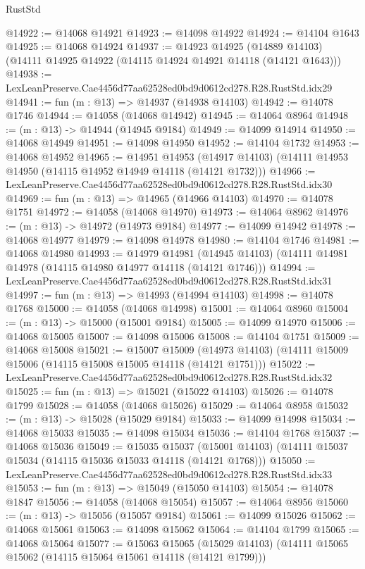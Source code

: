 \begin{lexlean}{RustStd}
\begin{coremodule}
@14922 := @14068 @14921
@14923 := @14098 @14922
@14924 := @14104 @1643
@14925 := @14068 @14924
@14937 := @14923
    @14925
    (@14889 @14103)
    (@14111 @14925 @14922 (@14115 @14924 @14921 @14118 (@14121 @1643)))
@14938 := LexLeanPreserve.Cae4456d77aa62528ed0bd9d0612cd278.R28.RustStd.idx29
@14941 := fun (m : @13) => @14937 (@14938 @14103)
@14942 := @14078 @1746
@14944 := @14058 (@14068 @14942)
@14945 := @14064 @8964
@14948 := (m : @13) -> @14944 (@14945 @9184)
@14949 := @14099 @14914
@14950 := @14068 @14949
@14951 := @14098 @14950
@14952 := @14104 @1732
@14953 := @14068 @14952
@14965 := @14951
    @14953
    (@14917 @14103)
    (@14111 @14953 @14950 (@14115 @14952 @14949 @14118 (@14121 @1732)))
@14966 := LexLeanPreserve.Cae4456d77aa62528ed0bd9d0612cd278.R28.RustStd.idx30
@14969 := fun (m : @13) => @14965 (@14966 @14103)
@14970 := @14078 @1751
@14972 := @14058 (@14068 @14970)
@14973 := @14064 @8962
@14976 := (m : @13) -> @14972 (@14973 @9184)
@14977 := @14099 @14942
@14978 := @14068 @14977
@14979 := @14098 @14978
@14980 := @14104 @1746
@14981 := @14068 @14980
@14993 := @14979
    @14981
    (@14945 @14103)
    (@14111 @14981 @14978 (@14115 @14980 @14977 @14118 (@14121 @1746)))
@14994 := LexLeanPreserve.Cae4456d77aa62528ed0bd9d0612cd278.R28.RustStd.idx31
@14997 := fun (m : @13) => @14993 (@14994 @14103)
@14998 := @14078 @1768
@15000 := @14058 (@14068 @14998)
@15001 := @14064 @8960
@15004 := (m : @13) -> @15000 (@15001 @9184)
@15005 := @14099 @14970
@15006 := @14068 @15005
@15007 := @14098 @15006
@15008 := @14104 @1751
@15009 := @14068 @15008
@15021 := @15007
    @15009
    (@14973 @14103)
    (@14111 @15009 @15006 (@14115 @15008 @15005 @14118 (@14121 @1751)))
@15022 := LexLeanPreserve.Cae4456d77aa62528ed0bd9d0612cd278.R28.RustStd.idx32
@15025 := fun (m : @13) => @15021 (@15022 @14103)
@15026 := @14078 @1799
@15028 := @14058 (@14068 @15026)
@15029 := @14064 @8958
@15032 := (m : @13) -> @15028 (@15029 @9184)
@15033 := @14099 @14998
@15034 := @14068 @15033
@15035 := @14098 @15034
@15036 := @14104 @1768
@15037 := @14068 @15036
@15049 := @15035
    @15037
    (@15001 @14103)
    (@14111 @15037 @15034 (@14115 @15036 @15033 @14118 (@14121 @1768)))
@15050 := LexLeanPreserve.Cae4456d77aa62528ed0bd9d0612cd278.R28.RustStd.idx33
@15053 := fun (m : @13) => @15049 (@15050 @14103)
@15054 := @14078 @1847
@15056 := @14058 (@14068 @15054)
@15057 := @14064 @8956
@15060 := (m : @13) -> @15056 (@15057 @9184)
@15061 := @14099 @15026
@15062 := @14068 @15061
@15063 := @14098 @15062
@15064 := @14104 @1799
@15065 := @14068 @15064
@15077 := @15063
    @15065
    (@15029 @14103)
    (@14111 @15065 @15062 (@14115 @15064 @15061 @14118 (@14121 @1799)))

\end{coremodule}
\end{lexlean}
